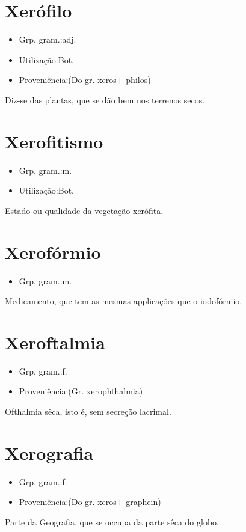 \section{Xerófilo}
\begin{itemize}
\item {Grp. gram.:adj.}
\end{itemize}
\begin{itemize}
\item {Utilização:Bot.}
\end{itemize}
\begin{itemize}
\item {Proveniência:(Do gr. \textunderscore xeros\textunderscore  + \textunderscore philos\textunderscore )}
\end{itemize}
Diz-se das plantas, que se dão bem nos terrenos secos.
\section{Xerofitismo}
\begin{itemize}
\item {Grp. gram.:m.}
\end{itemize}
\begin{itemize}
\item {Utilização:Bot.}
\end{itemize}
Estado ou qualidade da vegetação xerófita.
\section{Xerofórmio}
\begin{itemize}
\item {Grp. gram.:m.}
\end{itemize}
Medicamento, que tem as mesmas applicações que o iodofórmio.
\section{Xeroftalmia}
\begin{itemize}
\item {Grp. gram.:f.}
\end{itemize}
\begin{itemize}
\item {Proveniência:(Gr. \textunderscore xerophthalmia\textunderscore )}
\end{itemize}
Ofthalmia sêca, isto é, sem secreção lacrimal.
\section{Xerografia}
\begin{itemize}
\item {Grp. gram.:f.}
\end{itemize}
\begin{itemize}
\item {Proveniência:(Do gr. \textunderscore xeros\textunderscore  + \textunderscore graphein\textunderscore )}
\end{itemize}
Parte da Geografia, que se occupa da parte sêca do globo.

